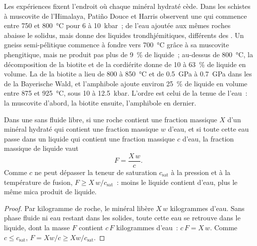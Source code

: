 Les expériences fixent l'endroit où chaque minéral hydraté cède. Dans les schistes à muscovite de l'Himalaya,
Patiño Douce et Harris observent une  qui commence entre 750 et \qty{800}{\celsius}
pour 6 à \qty{10}{kbar}~; de l'eau ajoutée aux mêmes roches abaisse le solidus, mais donne des liquides
trondhjémitiques, différents des . Un gneiss semi-pélitique commence à fondre vers
\qty{700}{\celsius} grâce à sa muscovite phengitique, mais ne produit pas plus de \qty{9}{\percent} de liquide~; au-dessus de
\qty{800}{\celsius}, la décomposition de la biotite et de la cordiérite donne de 10 à
\qty{63}{\percent} de liquide en volume.
La  de la biotite a lieu de 800 à \qty{850}{\celsius} et de
\qty{0.5}{GPa} à \qty{0.7}{GPa} dans les  de la Bayerische Wald, et l'amphibole
ajoute environ \qty{25}{\percent} de liquide en volume entre 875 et \qty{925}{\celsius}, sous 10 à
\qty{12.5}{kbar}. L'ordre est celui de la tenue de l'eau~: la muscovite d'abord, la biotite ensuite, l'amphibole en dernier.

\begin{proposition}\label{prop:b2:crustal-melting:water}
Dans une  sans fluide libre, si une roche contient une fraction massique $X$
d'un minéral hydraté qui contient une fraction massique $w$ d'eau, et si toute cette eau passe dans un liquide
qui contient une fraction massique $c$ d'eau, la fraction massique de liquide vaut
\[F = \frac{X\,w}{c}.\]
Comme $c$ ne peut dépasser la teneur de saturation $c_{\mathrm{sat}}$
à la pression et à la température de fusion, $F \ge X\,w/c_{\mathrm{sat}}$~:
moins le liquide contient d'eau, plus le même mica produit de liquide.
\end{proposition}

\begin{proof}
Par kilogramme de roche, le minéral libère $X\,w$ kilogrammes d'eau. Sans phase fluide ni eau restant dans les solides,
toute cette eau se retrouve dans le liquide, dont la masse $F$ contient $c\,F$
kilogrammes d'eau~: $c\,F = X\,w$. Comme $c \le c_{\mathrm{sat}}$, $F = Xw/c \ge
Xw/c_{\mathrm{sat}}$.
\end{proof}

